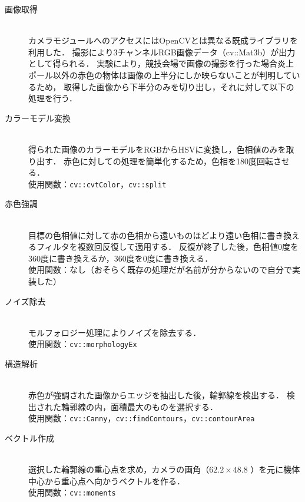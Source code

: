 \documentclass[11pt,a4]{jsarticle}
\begin{document}
    \begin{description}

      \item[画像取得] \mbox{} \\
        カメラモジュールへのアクセスにはOpenCVとは異なる既成ライブラリ\cite{raspicam}を利用した．
        撮影により3チャンネルRGB画像データ（cv::Mat3b）が出力として得られる．
        実験により，競技会場で画像の撮影を行った場合炎上ポール以外の赤色の物体は画像の上半分にしか映らないことが判明しているため，
        取得した画像から下半分のみを切り出し，それに対して以下の処理を行う．\\

      \item[カラーモデル変換] \mbox{} \\
        得られた画像のカラーモデルをRGBからHSVに変換し，色相値のみを取り出す．
        赤色に対しての処理を簡単化するため，色相を180度回転させる．\\
        使用関数：\texttt{cv::cvtColor}，\texttt{cv::split} \\

      \item[赤色強調] \mbox{} \\
        目標の色相値に対して赤の色相から遠いものほどより遠い色相に書き換えるフィルタを複数回反復して適用する．
        反復が終了した後，色相値0度を360度に書き換えるか，360度を0度に書き換える．\\
        使用関数：なし（おそらく既存の処理だが名前が分からないので自分で実装した） \\

      \item[ノイズ除去] \mbox{} \\
        モルフォロジー処理によりノイズを除去する．\\
        使用関数：\texttt{cv::morphologyEx} \\

      \item[構造解析] \mbox{} \\
        赤色が強調された画像からエッジを抽出した後，輪郭線を検出する．
        検出された輪郭線の内，面積最大のものを選択する．\\
        使用関数：\texttt{cv::Canny}，\texttt{cv::findContours}，\texttt{cv::contourArea} \\

      \item[ベクトル作成] \mbox{} \\
        選択した輪郭線の重心点を求め，カメラの画角（$62.2 \times 48.8$ \cite{elinux}）を元に機体中心から重心点へ向かうベクトルを作る．\\
        使用関数：\texttt{cv::moments} \\
    \end{description}
\end{document}
